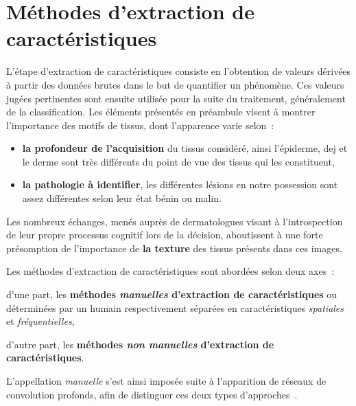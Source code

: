 \newpage

\section{Méthodes d'extraction de caractéristiques}
\label{chap:feature_extraction}
L'étape d'extraction de caractéristiques consiste en l'obtention de valeurs dérivées à partir des données brutes dans le but de quantifier un phénomène. Ces valeurs jugées pertinentes sont ensuite utilisée pour la suite du traitement, généralement de la classification. Les éléments présentés en préambule visent à montrer l'importance des motifs de tissus, dont l'apparence varie selon~:
\begin{itemize}
    \item \textbf{la profondeur de l'acquisition} du tissus considéré, ainsi l'épiderme, \gls{dej} et le derme sont très différents du point de vue des tissus qui les constituent,
    \item \textbf{la pathologie à identifier}, les différentes lésions en notre possession sont assez différentes selon leur état bénin ou malin.
\end{itemize}
Les nombreux échanges, menés auprès de dermatologues visant à l'introspection de leur propre processus cognitif lors de la décision, aboutissent à une forte présomption de l'importance de \textbf{la texture} des tissus présents dans ces images.\par

Les méthodes d'extraction de caractéristiques sont abordées selon deux axes~:
\begin{inlinerate}
    \item d'une part, les \textbf{méthodes \textit{manuelles} d'extraction de caractéristiques} ou déterminées par un humain respectivement séparées en caractéristiques \textit{spatiales} et \textit{fréquentielles},
    \item d'autre part, les \textbf{méthodes \textit{non manuelles} d'extraction de caractéristiques}.
\end{inlinerate} 
L'appellation \textit{manuelle} s'est ainsi imposée suite à l'apparition de réseaux de convolution profonds, afin de distinguer ces deux types d'approches~\cite{Nanni2017}.\par

